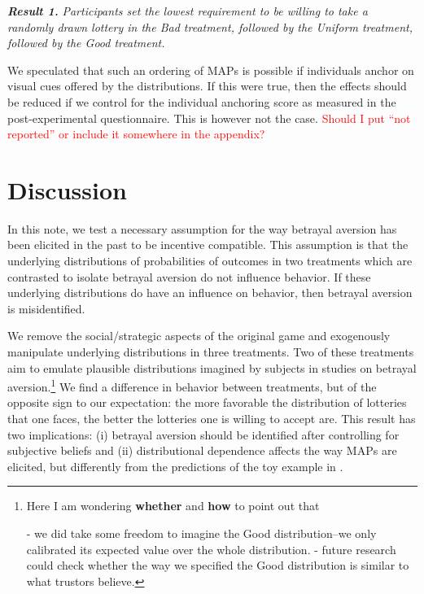 \textbf{\textit{Result 1.}} \textit{Participants set the lowest requirement to be willing to take a randomly drawn lottery in the Bad treatment, followed by the Uniform treatment, followed by the Good treatment.}

We speculated that such an ordering of MAPs is possible if individuals anchor on visual cues offered by the distributions.
If this were true, then the effects should be reduced if we control for the individual anchoring score \citep{Cheek2017} as measured in the post-experimental questionnaire.
This is however not the case.
\textcolor{red}{Should I put ``not reported'' or include it somewhere in the appendix?}


\section{Discussion}\label{sec:discussion}
In this note, we test a necessary assumption for the way betrayal aversion has been elicited in the past to be incentive compatible.
This assumption is that the underlying distributions of probabilities of outcomes in two treatments which are contrasted to isolate betrayal aversion do not influence behavior.
If these underlying distributions do have an influence on behavior, then betrayal aversion is misidentified.

We remove the social/strategic aspects of the original game and exogenously manipulate underlying distributions in three treatments.
Two of these treatments aim to emulate plausible distributions imagined by subjects in studies on betrayal aversion.\footnote{
Here I am wondering \textbf{whether} and \textbf{how} to point out that

- we did take some freedom to imagine the Good distribution--we only calibrated its expected value over the whole distribution.
- future research could check whether the way we specified the Good distribution is similar to what trustors believe.
}
We find a difference in behavior between treatments, but of the opposite sign to our expectation: the more favorable the distribution of lotteries that one faces, the better the lotteries one is willing to accept are.
This result has two implications: (i) betrayal aversion should be identified after controlling for subjective beliefs and (ii) distributional dependence affects the way MAPs are elicited, but differently from the predictions of the toy example in \cite{Li2020a}.

